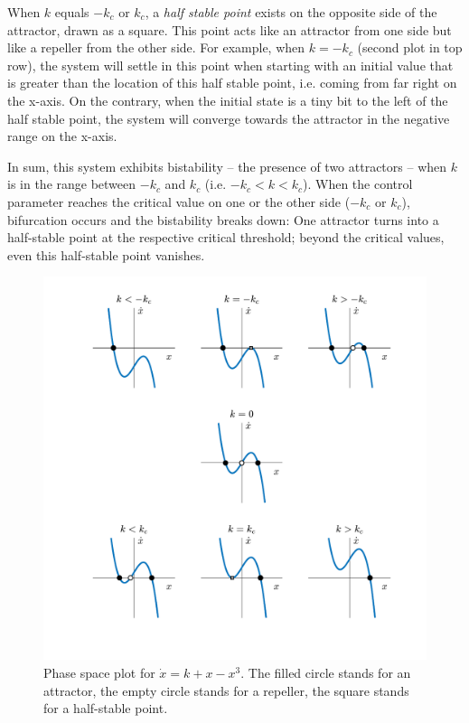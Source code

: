 When $k$ equals $-k_c$ or $k_c$, a \emph{half stable point} exists on the opposite side of the attractor, drawn as a square. This point acts like an attractor from one side but like a repeller from the other side. For example, when $k = -k_c$ (second plot in top row), the system will settle in this point when starting with an initial value that is greater than the location of this half stable point, i.e. coming from far right on the x-axis. On the contrary, when the initial state is a tiny bit to the left of the half stable point, the system will converge towards the attractor in the negative range on the x-axis.

In sum, this system exhibits bistability -- the presence of two attractors -- when $k$ is in the range between $-k_c$ and $k_c$ (i.e. $-k_c < k < k_c$). When the control parameter reaches the critical value on one or the other side ($-k_c$ or $k_c$), bifurcation occurs and the bistability breaks down: One attractor turns into a half-stable point at the respective critical threshold; beyond the critical values, even this half-stable point vanishes.

\begin{figure}[b]
\includegraphics[width=\textwidth]{figures/ch3/double_well_force.pdf}
\caption[Phase space plot for $\dot{x} = k + x - x^3$.]{Phase space plot for $\dot{x} = k + x - x^3$. The filled circle stands for an attractor, the empty circle stands for a repeller, the square stands for a half-stable point.}
\label{fig:double_well_force}
\end{figure}

